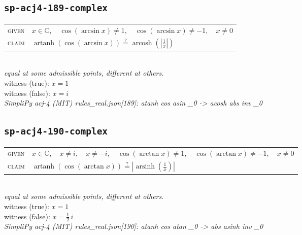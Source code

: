 \documentclass[11pt]{article}
\begin{document}
\subsection*{\texttt{sp-acj4-189-complex}}
\begin{tabular}{@{}l@{\quad}l@{}}
\textsc{given} & $x \in \mathbb{C},\quad \cos\left(\arcsin x\right) \neq 1,\quad \cos\left(\arcsin x\right) \neq -1,\quad x \neq 0$ \\[4pt]
\textsc{claim} & $\displaystyle \operatorname{artanh}\left(\cos\left(\arcsin x\right)\right) \overset{?}{=} \operatorname{arcosh}\left(\left|\frac{1}{x}\right|\right)$ \\
\end{tabular}\\[2pt]
{\small\emph{equal at some admissible points, different at others.}}\\
{\footnotesize\color{gray}witness (true): $x = 1$}\\
{\footnotesize\color{gray}witness (false): $x = i$}\\
\emph{SimpliPy acj-4 (MIT) rules\_real.json[189]: atanh cos asin \_0  ->  acosh abs inv \_0}\\

\subsection*{\texttt{sp-acj4-190-complex}}
\begin{tabular}{@{}l@{\quad}l@{}}
\textsc{given} & $x \in \mathbb{C},\quad x \neq i,\quad x \neq -i,\quad \cos\left(\arctan x\right) \neq 1,\quad \cos\left(\arctan x\right) \neq -1,\quad x \neq 0$ \\[4pt]
\textsc{claim} & $\displaystyle \operatorname{artanh}\left(\cos\left(\arctan x\right)\right) \overset{?}{=} \left|\operatorname{arsinh}\left(\frac{1}{x}\right)\right|$ \\
\end{tabular}\\[2pt]
{\small\emph{equal at some admissible points, different at others.}}\\
{\footnotesize\color{gray}witness (true): $x = 1$}\\
{\footnotesize\color{gray}witness (false): $x = \frac{1}{2} \, i$}\\
\emph{SimpliPy acj-4 (MIT) rules\_real.json[190]: atanh cos atan \_0  ->  abs asinh inv \_0}\\
\end{document}
